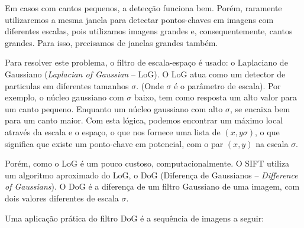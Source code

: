 Em casos com cantos pequenos, a detecção funciona bem. Porém, raramente utilizaremos a mesma janela para detectar pontos-chaves em imagens com diferentes escalas, pois utilizamos imagens grandes e, consequentemente, cantos grandes. Para isso, precisamos de janelas grandes também. 

Para resolver este problema, o filtro de escala-espaço é usado: o Laplaciano de Gaussiano ({\it Laplacian of Gaussian} --  LoG). O LoG atua como um detector de particulas em diferentes tamanhos $\sigma$. (Onde $\sigma$ é o parâmetro de escala). Por exemplo, o núcleo gaussiano com $\sigma$ baixo, tem como resposta um alto valor para um canto pequeno. Enquanto um núcleo gaussiano com alto $\sigma$, se encaixa bem para um canto maior. Com esta lógica, podemos encontrar um máximo local através da escala e o espaço, o que nos fornece uma lista de $(x,y \sigma)$, o que significa que existe um ponto-chave em potencial, com o par $(x,y)$ na escala $\sigma$.


Porém, como o LoG é um pouco custoso, computacionalmente. O SIFT utiliza um algoritmo aproximado do LoG, o DoG (Diferença de Gaussianos -- {\it Difference of Gaussians}). O DoG é a diferença de um filtro Gaussiano de uma imagem, com dois valores diferentes de escala $\sigma$. 

Uma aplicação prática do filtro DoG é a sequência de imagens a seguir:

